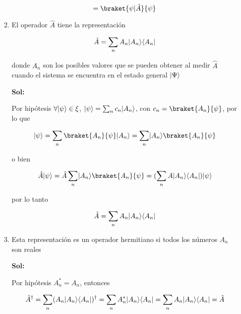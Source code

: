 \documentclass[12pt,a4paper]{article}
\DeclarePairedDelimiter\bra{\langle}{\rvert}
\DeclarePairedDelimiter\ket{\lvert}{\rangle}
\begin{document}
\begin{enumerate}
\begin{enumerate}
    \begin{equation*}
        = \braket{\psi | \hat{A}}{\psi}
    \end{equation*}
    
    \item El operador $\hat{A}$ tiene la representación
    
    \begin{equation*}
        \hat{A} = \sum_{n} A_n \ket{A_n} \bra{A_n}
    \end{equation*}
    
    donde $A_n$ son los posibles valores que se pueden obtener al medir $\hat{A}$ cuando el sistema se encuentra en el estado general $\ket{\Psi}$
    
    \textbf{Sol:}
    
    Por hipótesis $\forall \ket{\psi} \in \xi$, $\ket{\psi} = \sum_{n} c_n \ket{A_n}$, con $c_n = \braket{A_n}{\psi}$, por lo que
    
    \begin{equation*}
        \ket{\psi} = \sum_{n} \braket{A_n}{\psi} \ket{A_n}= \sum_{n} \ket{A_n} \braket{A_n}{\psi}
    \end{equation*}
    
    o bien
    
    \begin{equation*}
        \hat{A} \ket{\psi} = \hat{A} \sum_{n} \ket{A_n} \braket{A_n}{\psi} = (\sum_{n} A \ket{A_n}\bra{A_n}) \ket{\psi}
    \end{equation*}
    
    por lo tanto
    
    \begin{equation*}
        \hat{A} = \sum_{n} A_n \ket{A_n} \bra{A_n}
    \end{equation*}
    
    \item Esta representación es un operador hermitiano si todos los números $A_n$ son reales
    
    \textbf{Sol:}
    
    Por hipótesis $A_{n}^{*}= A_{n}$, entonces
    
    \begin{equation*}
        \hat{A}^{\dagger} = \sum_{n} (A_n \ket{A_n}\bra{A_n})^{\dagger} = \sum_{n} A_{n}^{*} \ket{A_n} \bra{A_n} = \sum_{n} A_n \ket{A_n} \bra{A_n} = \hat{A}
    \end{equation*}
    
\end{enumerate}




\end{enumerate}
\end{document}
